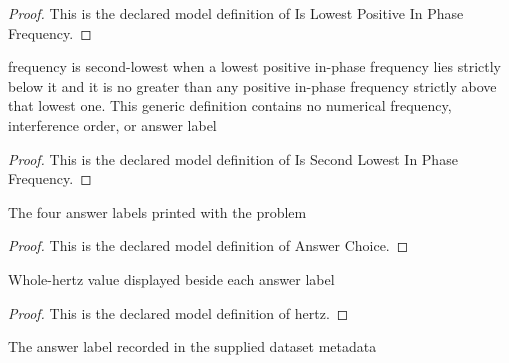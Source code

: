 \begin{proof}
  This is the declared model definition of Is Lowest Positive In Phase Frequency.
\end{proof}
\begin{definition}
  \label{def:physics:phyx-mini-0330:phyxminiproblems-problemphyxmini0330-issecondlowestinphasefrequency}
  frequency is second-lowest when a lowest positive in-phase frequency lies strictly below it and it is no greater than any positive in-phase frequency strictly above that lowest one. This generic definition contains no numerical frequency, interference order, or answer label
\end{definition}
\begin{proof}
  This is the declared model definition of Is Second Lowest In Phase Frequency.
\end{proof}
\begin{definition}
  \label{def:physics:phyx-mini-0330:phyxminiproblems-problemphyxmini0330-answerchoice}
  The four answer labels printed with the problem
\end{definition}
\begin{proof}
  This is the declared model definition of Answer Choice.
\end{proof}
\begin{definition}[hertz]
  \label{def:physics:phyx-mini-0330:phyxminiproblems-problemphyxmini0330-answerchoice-hertz}
  Whole-hertz value displayed beside each answer label
\end{definition}
\begin{proof}
  This is the declared model definition of hertz.
\end{proof}
\begin{definition}
  \label{def:physics:phyx-mini-0330:phyxminiproblems-problemphyxmini0330-recordeddatasetanswer}
  The answer label recorded in the supplied dataset metadata
\end{definition}

